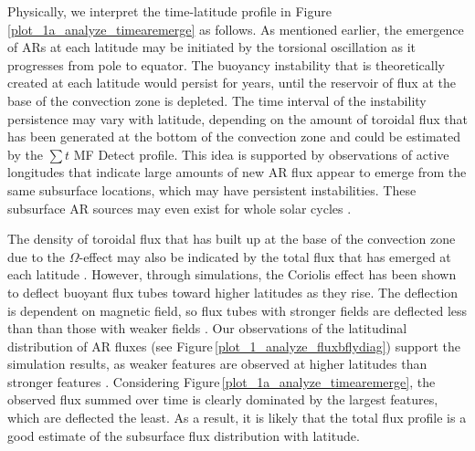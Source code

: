 \documentclass[namedreferences]{solarphysics}
\begin{document}
\begin{article}
Physically, we interpret the time-latitude profile in Figure\,\ref{plot_1a_analyze_timearemerge} as follows.
As mentioned earlier, the emergence of ARs at each latitude may be initiated by the torsional oscillation as it progresses from pole to equator. The buoyancy instability that is theoretically created at each latitude would persist for years, until the reservoir of flux at the base of the convection zone is depleted. The time interval of the instability persistence may vary with latitude, depending on the amount of toroidal flux that has been generated at the bottom of the convection zone and could be estimated by the $\sum t$ MF Detect profile. This idea is supported by observations of active longitudes \citep{Gaizauskas:1983, chen:2011} that indicate large amounts of new AR flux appear to emerge from the same subsurface locations, which may have persistent instabilities. These subsurface AR sources may even exist for whole solar cycles \citep{Henney:2002, Berdyugina:2003}.

The density of toroidal flux that has built up at the base of the convection zone due to the $\Omega$-effect may also be indicated by the total flux that has emerged at each latitude \citep{Charbonneau:2010}. However, through simulations, the Coriolis effect has been shown to deflect buoyant flux tubes toward higher latitudes as they rise. The deflection is dependent on magnetic field, so flux tubes with stronger fields are deflected less than than those with weaker fields \citep[][and references therein]{Fan:2009}. 
Our observations of the latitudinal distribution of AR fluxes (see Figure\,\ref{plot_1_analyze_fluxbflydiag}) support the simulation results, as weaker features are observed at higher latitudes than stronger features \citep[this has also been observed by]{tang:1984,harvey:1993,meunier:2003}. Considering Figure\,\ref{plot_1a_analyze_timearemerge}, the observed flux summed over time is clearly dominated by the largest features, which are deflected the least. As a result, it is likely that the total flux profile is a good estimate of the subsurface flux distribution with latitude.



\end{article}
\end{document}
